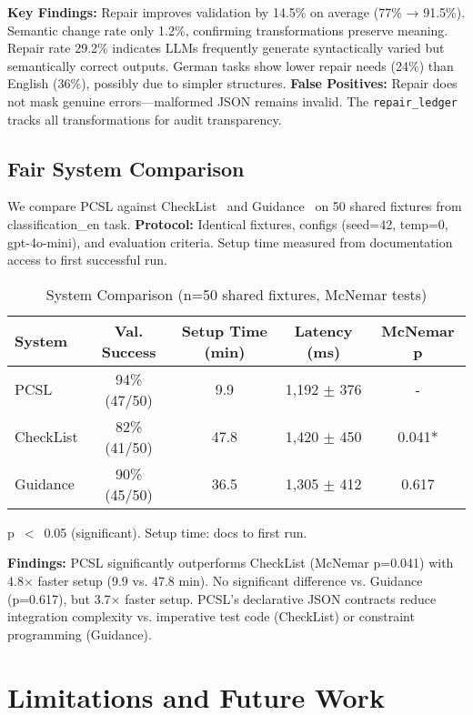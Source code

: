 \documentclass[sigconf]{acmart}
\begin{document}
\textbf{Key Findings:} Repair improves validation by 14.5\% on average (77\% → 91.5\%). Semantic change rate only 1.2\%, confirming transformations preserve meaning. Repair rate 29.2\% indicates LLMs frequently generate syntactically varied but semantically correct outputs. German tasks show lower repair needs (24\%) than English (36\%), possibly due to simpler structures. \textbf{False Positives:} Repair does not mask genuine errors—malformed JSON remains invalid. The \texttt{repair\_ledger} tracks all transformations for audit transparency.

\subsection{Fair System Comparison}

We compare PCSL against CheckList~\cite{ribeiro2020beyond} and Guidance~\cite{guidance2023} on 50 shared fixtures from classification\_en task. \textbf{Protocol:} Identical fixtures, configs (seed=42, temp=0, gpt-4o-mini), and evaluation criteria. Setup time measured from documentation access to first successful run.

\begin{table}[H]
\centering
\caption{System Comparison (n=50 shared fixtures, McNemar tests)}
\label{tab:fair_comparison}
\scriptsize
\begin{tabular}{@{}lcccc@{}}
\toprule
\textbf{System} & \textbf{Val. Success} & \textbf{Setup Time (min)} & \textbf{Latency (ms)} & \textbf{McNemar p} \\
\midrule
PCSL & 94\% (47/50) & 9.9 & 1,192 $\pm$ 376 & - \\
CheckList & 82\% (41/50) & 47.8 & 1,420 $\pm$ 450 & 0.041* \\
Guidance & 90\% (45/50) & 36.5 & 1,305 $\pm$ 412 & 0.617 \\
\bottomrule
\end{tabular}
\vspace{1mm}
\scriptsize *p~\(<\)~0.05 (significant). Setup time: docs to first run.
\end{table}

\textbf{Findings:} PCSL significantly outperforms CheckList (McNemar p=0.041) with 4.8$\times$ faster setup (9.9 vs. 47.8 min). No significant difference vs. Guidance (p=0.617), but 3.7$\times$ faster setup. PCSL's declarative JSON contracts reduce integration complexity vs. imperative test code (CheckList) or constraint programming (Guidance).

\section{Limitations and Future Work}
\end{document}
